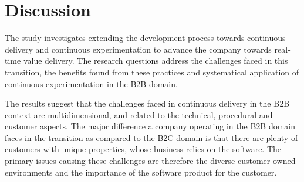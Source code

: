 \documentclass[english, grading]{tktltiki2}
\theoremstyle{definition}
\theoremstyle{remark}
\begin{document}




\section{Discussion}

The study investigates extending the development process towards continuous delivery and continuous experimentation to advance the company towards real-time value delivery. The research questions address the challenges faced in this transition, the benefits found from these practices and systematical application of continuous experimentation in the B2B domain. 


%



The results suggest that the challenges faced in continuous delivery in the B2B context are multidimensional, and related to the technical, procedural and customer aspects. The major difference a company operating in the B2B domain faces in the transition as compared to the B2C domain is that there are plenty of customers with unique properties, whose business relies on the software. The primary issues causing these challenges are therefore the diverse customer owned environments and the importance of the software product for the customer. 
\end{document}
